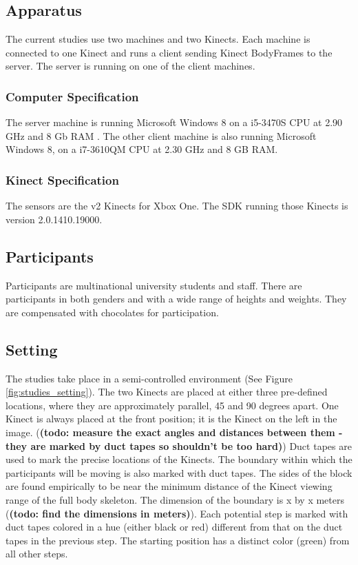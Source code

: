 \subsection{Apparatus}

The current studies use two machines and two Kinects. Each machine is connected to one Kinect and runs a client sending Kinect BodyFrames to the server. The server is running on one of the client machines.

\subsubsection{Computer Specification}

The server machine is running Microsoft Windows 8 on a i5-3470S CPU at 2.90 GHz and 8 Gb RAM . The other client machine is also running Microsoft Windows 8, on a i7-3610QM CPU at 2.30 GHz and 8 GB RAM.

\subsubsection{Kinect Specification}

The sensors are the v2 Kinects for Xbox One. The SDK running those Kinects is version 2.0.1410.19000.

\subsection{Participants}

Participants are multinational university students and staff. There are participants in both genders and with a wide range of heights and weights. They are compensated with chocolates for participation.

\subsection{Setting}

The studies take place in a semi-controlled environment (See Figure \ref{fig:studies_setting}). The two Kinects are placed at either three pre-defined locations, where they are approximately parallel, 45 and 90 degrees apart. One Kinect is always placed at the front position; it is the Kinect on the left in the image. (\textbf{(todo: measure the exact angles and distances between them - they are marked by duct tapes so shouldn't be too hard)}) Duct tapes are used to mark the precise locations of the Kinects. The boundary within which the participants will be moving is also marked with duct tapes. The sides of the block are found empirically to be near the minimum distance of the Kinect viewing range of the full body skeleton. The dimension of the boundary is x by x meters (\textbf{(todo: find the dimensions in meters)}). Each potential step is marked with duct tapes colored in a hue (either black or red) different from that on the duct tapes in the previous step. The starting position has a distinct color (green) from all other steps.

